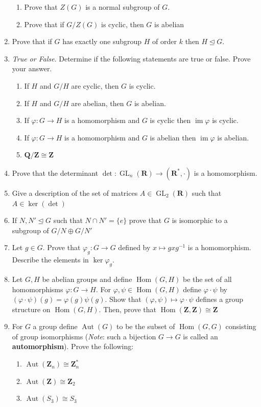 \documentclass[12pt]{article}
\numberwithin{equation}{subsection}
\theoremstyle{note}
\newcommand{\GL}{\operatorname{GL}}
\newcommand{\nrml}{\trianglelefteq}
\newcommand{\img}{\operatorname{im}}
\newcommand{\Hom}{\operatorname{Hom}}
\newcommand{\Aut}{\operatorname{Aut}}
\begin{document}
\begin{enumerate}[label=\arabic*.]
		\begin{enumerate} 
		\item Prove that $Z(G)$ is a normal subgroup of $G$. 
		\item Prove that if $G/Z(G)$ is cyclic, then $G$ is abelian
		\end{enumerate}
	\item Prove that if $G$ has exactly one subgroup $H$ of order $k$ then $H\nrml G$. 
	\item \textit{True or False}. Determine if the following statements are true or false. Prove your answer. \begin{enumerate}
		\item If $H$ and $G/H$ are cyclic, then $G$ is cyclic.
		\item If $H$ and $G/H$ are abelian, then $G$ is abelian. 
		\item If $\varphi\colon G\to H$ is a homomorphism and $G$ is cyclic then $\img \varphi$ is cyclic.
		\item If $\varphi\colon G\to H$ is a homomorphism and $G$ is abelian then $\img \varphi$ is abelian. 
		\item $\mathbf{Q}/\mathbf{Z}\cong \mathbf{Z}$
	\end{enumerate} 
	\item Prove that the determinant $\det\colon \GL_n(\mathbf{R})\to (\mathbf{R}^*,\cdot)$ is a homomorphism. 
	\item Give a description of the set of matrices $A\in \GL_2(\mathbf{R})$ such that $A\in \ker(\det)$
	\item If $N,N'\nrml G$ such that $N\cap N'=\{e\}$ prove that $G$ is isomorphic to a subgroup of  $G/N \oplus G/N'$
	\item Let $g\in G$. Prove that $\varphi_g\colon G\to G$ defined by $x\mapsto gxg^{-1}$ is a homomorphism. Describe the elements in $\ker\varphi_g$.
	\item Let $G,H$ be abelian groups and define $\Hom(G,H)$ be the set of all homomorphisms $\varphi\colon G\to H$. For $\varphi, \psi\in \Hom(G,H)$ define $\varphi\cdot \psi$ by $(\varphi\cdot \psi)(g)=\varphi(g)\psi(g)$. Show that $(\varphi,\psi)\mapsto \varphi\cdot \psi$ defines a group structure on $\Hom(G,H)$. Then, prove that $\Hom(\mathbf{Z},\mathbf{Z})\cong \mathbf{Z}$
	\item For $G$ a group define $\Aut(G)$ to be the subset of $\Hom(G,G)$ consisting of group isomorphisms (\textit{Note}: such a bijection $G\to G$ is called an \textbf{automorphism}). Prove the following: 
	\begin{enumerate}
		\item $\Aut(\mathbf{Z}_n)\cong\mathbf{Z}_n^*$
	 	\item $\Aut(\mathbf{Z})\cong \mathbf{Z}_2$
	 	\item $\Aut(S_3)\cong S_3$
	 \end{enumerate}
	 
\end{enumerate}
\end{document}

